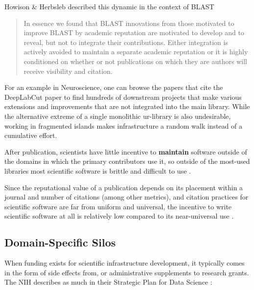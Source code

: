 \documentclass[notoc]{tufte-book}
\begin{document}
Howison \& Herbsleb described this dynamic in the context of BLAST

\begin{quote}
In essence we found that BLAST innovations from those motivated to
improve BLAST by academic reputation are motivated to develop and to
reveal, but not to integrate their contributions. Either integration is
actively avoided to maintain a separate academic reputation or it is
highly conditioned on whether or not publications on which they are
authors will receive visibility and citation. \citep{howisonIncentivesIntegrationScientific2013} 
\end{quote}

For an example in Neuroscience, one can browse the papers that cite the
DeepLabCut paper \citep{mathisDeepLabCutMarkerlessPose2018a}  to
find hundreds of downstream projects that make various extensions and
improvements that are not integrated into the main library. While the
alternative extreme of a single monolithic ur-library is also
undesirable, working in fragmented islands makes infrastructure a random
walk instead of a cumulative effort.

After publication, scientists have little incentive to \textbf{maintain}
software outside of the domains in which the primary contributors use
it, so outside of the most-used libraries most scientific software is
brittle and difficult to use \citep{mangulImprovingUsabilityArchival2019, kumarBioinformaticsSoftwareBiologists2007} .

Since the reputational value of a publication depends on its placement
within a journal and number of citations (among other metrics), and
citation practices for scientific software are far from uniform and
universal, the incentive to write scientific software at all is
relatively low compared to its near-universal use \citep{howisonSoftwareScientificLiterature2016} .


\subsection{Domain-Specific Silos}

When funding exists for scientific infrastructure development, it
typically comes in the form of side effects from, or administrative
supplements to research grants. The NIH describes as much in their
Strategic Plan for Data Science \citep{NIHStrategicPlan2018} :
\end{document}
